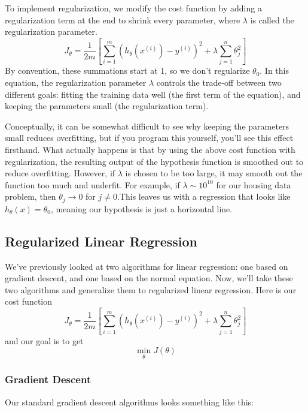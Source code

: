 To implement regularization, we modify the cost function by adding a regularization term at the end to shrink every parameter, where $\lambda$ is called the regularization parameter. 
\begin{equation}
J_\theta = \frac{1}{2m}\left[ \sum_{i=1}^m \left(h_\theta\left( x^{(i)}\right) - y^{(i)}\right)^2 + \lambda\sum_{j=1}^n \theta_j^2\right]
\end{equation}
By convention, these summations start at $1$, so we don't regularize $\theta_0$. In this equation, the regularization parameter $\lambda$ controls the trade-off between two different goals: fitting the training data well (the first term of the equation), and keeping the parameters small (the regularization term). 

Conceptually, it can be somewhat difficult to see why keeping the parameters small reduces overfitting, but if you program this yourself, you'll see this effect firsthand. What actually happens is that by using the above cost function with regularization, the resulting output of the hypothesis function is smoothed out to reduce overfitting. However, if $\lambda$ is chosen to be too large, it may smooth out the function too much and underfit. For example, if $\lambda \sim 10^{10}$ for our housing data problem, then $\theta_j \to 0$ for $j \neq 0$.This leaves us with a regression that looks like $h_\theta\left(x\right) = \theta_0$, meaning our hypothesis is just a horizontal line. 


\subsection{Regularized Linear Regression}
We've previously looked at two algorithms for linear regression: one based on gradient descent, and one based on the normal equation. Now, we'll take these two algorithms and generalize them to regularized linear regression. Here is our cost function
\begin{equation}
J_\theta = \frac{1}{2m}\left[ \sum_{i=1}^m \left(h_\theta\left( x^{(i)}\right) - y^{(i)}\right)^2 + \lambda\sum_{j=1}^n \theta_j^2\right]
\end{equation}
and our goal is to get
\begin{equation}
\min_\theta J\left(\theta\right)
\end{equation}

\subsubsection{Gradient Descent}
Our standard gradient descent algorithms looks something like this:

